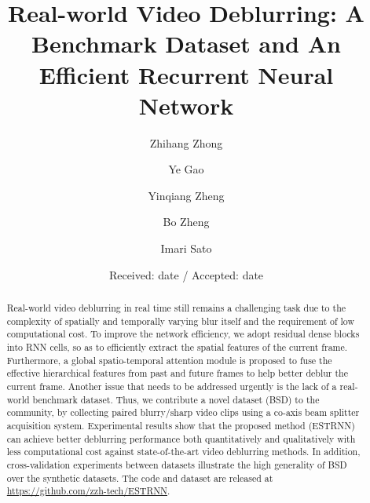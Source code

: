 \documentclass[twocolumn]{svjour3}          \smartqed  \usepackage{graphicx}
\begin{document}
\sloppy

\title{Real-world Video Deblurring: A Benchmark Dataset and An Efficient Recurrent Neural Network}



\author{Zhihang Zhong         \and
        Ye Gao\and Yinqiang Zheng\and Bo Zheng\and Imari Sato }




\date{Received: date / Accepted: date}



\maketitle

\begin{abstract}
Real-world video deblurring in real time still remains a challenging task due to the complexity of spatially and temporally varying blur itself and the requirement of low computational cost. To improve the network efficiency, we adopt residual dense blocks into RNN cells, so as to efficiently extract the spatial features of the current frame. Furthermore, a global spatio-temporal attention module is proposed to fuse the effective hierarchical features from past and future frames to help better deblur the current frame. Another issue that needs to be addressed urgently is the lack of a real-world benchmark dataset. Thus, we contribute a novel dataset (BSD) to the community, by collecting paired blurry/sharp video clips using a co-axis beam splitter acquisition system. Experimental results show that the proposed method (ESTRNN) can achieve better deblurring performance both quantitatively and qualitatively with less computational cost against state-of-the-art video deblurring methods. In addition, cross-validation experiments between datasets illustrate the high generality of BSD over the synthetic datasets. The code and dataset are released at \href{https://github.com/zzh-tech/ESTRNN}{https://github.com/zzh-tech/ESTRNN}.
\end{abstract}
\end{document}
